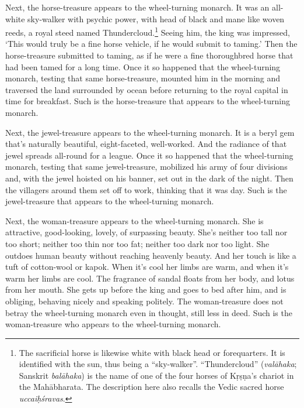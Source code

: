\documentclass[12pt,openany]{book}%
\begin{document}
Next, the horse-treasure appears to the wheel-turning monarch. It was an all-white sky-walker with psychic power, with head of black and mane like woven reeds, a royal steed named Thundercloud.\footnote{The sacrificial horse is likewise white with black head or forequarters. It is identified with the sun, thus being a “sky-walker”. “Thundercloud” (\textit{\textsanskrit{valāhaka}}; Sanskrit \textit{\textsanskrit{balāhaka}}) is the name of one of the four horses of \textsanskrit{Kṛṣṇa}’s chariot in the \textsanskrit{Mahābharata}. The description here also recalls the Vedic sacred horse \textit{\textsanskrit{uccaiḥśravas}}. } Seeing him, the king was impressed, ‘This would truly be a fine horse vehicle, if he would submit to taming.’ Then the horse-treasure submitted to taming, as if he were a fine thoroughbred horse that had been tamed for a long time. Once it so happened that the wheel-turning monarch, testing that same horse-treasure, mounted him in the morning and traversed the land surrounded by ocean before returning to the royal capital in time for breakfast. Such is the horse-treasure that appears to the wheel-turning monarch. 

Next, the jewel-treasure appears to the wheel-turning monarch. It is a beryl gem that’s naturally beautiful, eight-faceted, well-worked. And the radiance of that jewel spreads all-round for a league. Once it so happened that the wheel-turning monarch, testing that same jewel-treasure, mobilized his army of four divisions and, with the jewel hoisted on his banner, set out in the dark of the night. Then the villagers around them set off to work, thinking that it was day. Such is the jewel-treasure that appears to the wheel-turning monarch. 

Next, the woman-treasure appears to the wheel-turning monarch. She is attractive, good-looking, lovely, of surpassing beauty. She’s neither too tall nor too short; neither too thin nor too fat; neither too dark nor too light. She outdoes human beauty without reaching heavenly beauty. And her touch is like a tuft of cotton-wool or kapok. When it’s cool her limbs are warm, and when it’s warm her limbs are cool. The fragrance of sandal floats from her body, and lotus from her mouth. She gets up before the king and goes to bed after him, and is obliging, behaving nicely and speaking politely. The woman-treasure does not betray the wheel-turning monarch even in thought, still less in deed. Such is the woman-treasure who appears to the wheel-turning monarch. 
\end{document}
